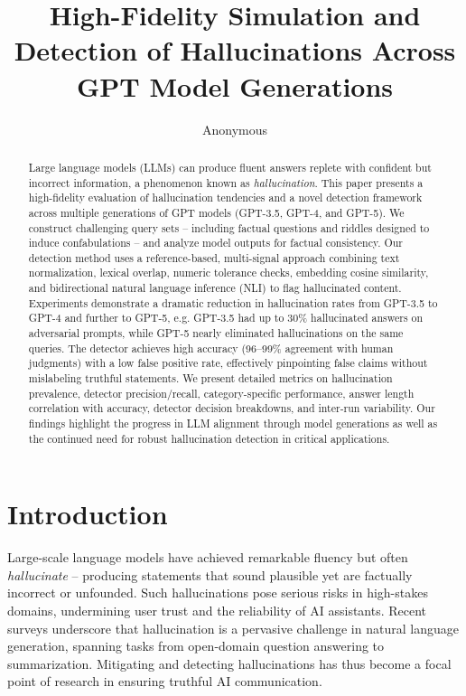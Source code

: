\documentclass{article}
\title{High-Fidelity Simulation and Detection of Hallucinations Across GPT Model Generations}
\author{Anonymous}
\date{}
\begin{document}
\maketitle

\begin{abstract}
Large language models (LLMs) can produce fluent answers replete with confident but incorrect information, a phenomenon known as \textit{hallucination}. This paper presents a high-fidelity evaluation of hallucination tendencies and a novel detection framework across multiple generations of GPT models (GPT-3.5, GPT-4, and GPT-5). We construct challenging query sets -- including factual questions and riddles designed to induce confabulations -- and analyze model outputs for factual consistency. Our detection method uses a reference-based, multi-signal approach combining text normalization, lexical overlap, numeric tolerance checks, embedding cosine similarity, and bidirectional natural language inference (NLI) to flag hallucinated content. Experiments demonstrate a dramatic reduction in hallucination rates from GPT-3.5 to GPT-4 and further to GPT-5, e.g. GPT-3.5 had up to 30\% hallucinated answers on adversarial prompts, while GPT-5 nearly eliminated hallucinations on the same queries. The detector achieves high accuracy (96--99\% agreement with human judgments) with a low false positive rate, effectively pinpointing false claims without mislabeling truthful statements. We present detailed metrics on hallucination prevalence, detector precision/recall, category-specific performance, answer length correlation with accuracy, detector decision breakdowns, and inter-run variability. Our findings highlight the progress in LLM alignment through model generations as well as the continued need for robust hallucination detection in critical applications.
\end{abstract}

\section{Introduction}
Large-scale language models have achieved remarkable fluency but often \textit{hallucinate} -- producing statements that sound plausible yet are factually incorrect or unfounded. Such hallucinations pose serious risks in high-stakes domains, undermining user trust and the reliability of AI assistants. Recent surveys \cite{ji2023survey} underscore that hallucination is a pervasive challenge in natural language generation, spanning tasks from open-domain question answering to summarization. Mitigating and detecting hallucinations has thus become a focal point of research in ensuring truthful AI communication.
\end{document}
